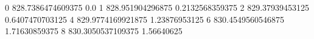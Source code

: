 0 828.7386474609375 0.0
1 828.951904296875 0.2132568359375
2 829.37939453125 0.6407470703125
4 829.9774169921875 1.23876953125
6 830.4549560546875 1.71630859375
8 830.3050537109375 1.56640625

